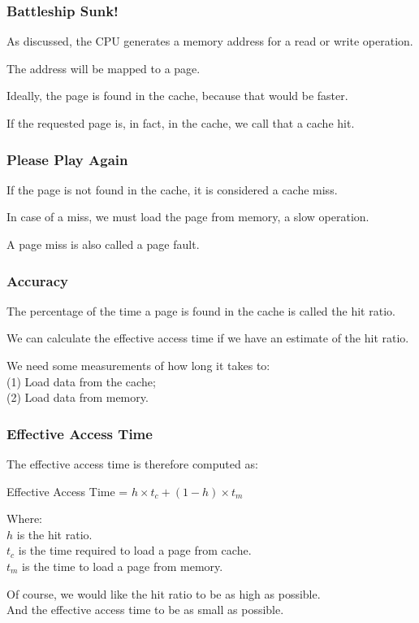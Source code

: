 \begin{frame}
\frametitle{Battleship Sunk!}

As discussed, the CPU generates a memory address for a read or write operation. 

The address will be mapped to a page. 

Ideally, the page is found in the cache, because that would be faster. 

If the requested page is, in fact,  in the cache, we call that a cache \alert{hit}.

\end{frame}

\begin{frame}
\frametitle{Please Play Again}

If the page is not found in the cache, it is considered a cache \alert{miss}. 

In case of a miss, we must load the page from memory, a slow operation. 

A page miss is also called a \alert{page fault}.

\end{frame}

\begin{frame}
\frametitle{Accuracy}

The percentage of the time  a page is found in the cache is called the \alert{hit ratio}.

We can calculate the effective access time if we have an estimate of the hit ratio.

We need some measurements of how long it takes to:\\
\quad (1) Load data from the cache;\\
\quad (2) Load data from memory. 

\end{frame}

\begin{frame}
\frametitle{Effective Access Time}

The effective access time is therefore computed as:

\begin{center}
Effective Access Time = $h \times t_{c} + (1-h) \times t_{m}$
\end{center}

Where:\\
\quad $h$ is the hit ratio.\\
\quad $t_{c}$ is the time required to load a page from cache.\\
\quad $t_{m}$ is the time to load a page from memory. 


Of course, we would like the hit ratio to be as high as possible.\\
\quad And the effective access time to be as small as possible.

\end{frame}

